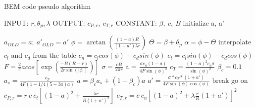\begin{algorithm}
\caption{BEM code pseudo algorithm}\label{alg:BEM}
\begin{algorithmic}
\State INPUT: $r, \theta_p, \lambda$
\State OUTPUT: $c_{P,r}, \ c_{T,r}$
\State CONSTANT: $\beta, \ c, \ B$
\State initialize a, a'

  \State  $a_{OLD}=a; \ a'_{OLD}=a'$
  \State  $\phi = \arctan\left(\frac{(1-a)R}{(1+a')\lambda r}\right)$ 
  \State  $\Theta = \beta + \theta_p$
  \State  $\alpha = \phi - \Theta$
  \State  interpolate $c_l$ and $c_d$ from the table
  \State  $c_n = c_l cos(\phi) + c_d sin(\phi)$
  \State  $c_t = c_l sin(\phi) - c_d cos(\phi)$
  \State  $F = \frac{2}{\pi} acos \left[\exp\left(\frac{-B(R - r)}{2r\sin(\left|\phi\right|)}\right)\right]$
  \State  $\sigma = \frac{cB}{2\pi r}$
  \State  a = $\frac{\sigma c_n (1 - a)}{4 F \sin(\phi)^2}$
  \Else
    \State  $c_T = \frac{(1 - a)^2c_n\sigma}{\sin(\phi)^2}$
    \State  $\beta_c = 0.1$
    \State  $a_s = \frac{c_T}{4F(1 - 1/4(5 - 3a)a)}$
    \State  $a = \beta_c a_s + (1 - \beta_c)a$
  \EndIf
  \State  $a' = \frac{\sigma*c_T*(1 + a')}{4F\sin(\phi)\cos(\phi)}$
    \State break
  \Else
    \State go on
  \EndIf
\EndFor
\State  $c_{P,r} = r \ c \ c_t\left[(1 - a)^2 + \frac{\lambda r}{R(1 + a')^2}\right]$
\State  $c_{T,r} = c \ c_n\left[(1 - a)^2 + \lambda \frac{r}{R} (1 + a')\right]^2$
\end{algorithmic}
\end{algorithm}